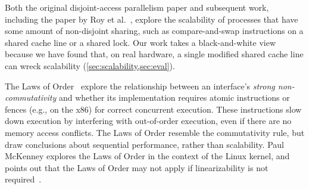 


Both the original disjoint-access parallelism paper and subsequent work,
including the paper by Roy et al.~\cite{roy:limits-dap}, explore the scalability
of processes that have some amount of non-disjoint sharing, such as
compare-and-swap instructions on a shared cache line or a shared lock.
Our work takes a black-and-white view because we have found that, on real
hardware, a single modified
shared cache line can wreck
scalability (\cref{sec:scalability,sec:eval}).

The Laws of Order~\cite{law:orders} explore the relationship between an
interface's \emph{strong non-commutativity} and whether its implementation
requires atomic instructions or fences (e.g.,  on the x86) for
correct concurrent execution.  These instructions slow down execution by
interfering with out-of-order execution, even if there are no memory access
conflicts.  The Laws of Order resemble the commutativity rule, but draw
conclusions about sequential performance, rather than scalability.
%
Paul McKenney
explores the Laws of Order in the context of the Linux kernel, and points out
that the Laws of Order may not apply if linearizability is not
required~\cite{lwn:law}.


